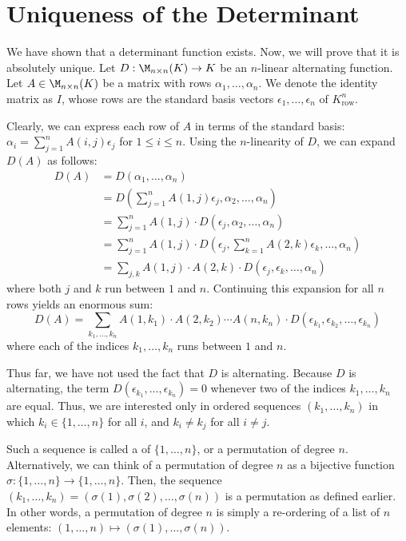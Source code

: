 \section{Uniqueness of the Determinant}

We have shown that a determinant function exists. Now, we will prove that it is absolutely unique. Let $D : \M_{n \times n}(K) \to K$ be an $n$-linear alternating function.
Let $A \in \M_{n \times n}(K)$ be a matrix with rows $\alpha_1, \dots, \alpha_n$. We denote the identity matrix as $I$, whose rows are the standard basis vectors $\epsilon_1, \dots, \epsilon_n$ of $K^n_{\text{row}}$.

Clearly, we can express each row of $A$ in terms of the standard basis: $\alpha_i = \sum_{j=1}^n A(i,j)\epsilon_j$ for $1 \le i \le n$. Using the $n$-linearity of $D$, we can expand $D(A)$ as follows:
\begin{align*}
  D(A) &= D(\alpha_1, \dots, \alpha_n) \\
  &= D\left(\sum_{j=1}^n A(1,j)\epsilon_j, \alpha_2, \dots, \alpha_n\right) \\
  &= \sum_{j=1}^n A(1,j) \cdot D(\epsilon_j, \alpha_2, \dots, \alpha_n) \\
  &= \sum_{j=1}^n A(1,j) \cdot D\left(\epsilon_j, \sum_{k=1}^n A(2,k)\epsilon_k, \dots, \alpha_n\right) \\
  &= \sum_{j,k} A(1,j) \cdot A(2,k) \cdot D(\epsilon_j, \epsilon_k, \dots, \alpha_n)
\end{align*}
where both $j$ and $k$ run between $1$ and $n$. Continuing this expansion for all $n$ rows yields an enormous sum:
\[
D(A) = \sum_{k_1, \dots, k_n} A(1,k_1) \cdot A(2,k_2) \cdots A(n,k_n) \cdot D(\epsilon_{k_1}, \epsilon_{k_2}, \dots, \epsilon_{k_n})
\]
where each of the indices $k_1, \dots, k_n$ runs between $1$ and $n$.

Thus far, we have not used the fact that $D$ is alternating. Because $D$ is alternating, the term $D(\epsilon_{k_1}, \dots, \epsilon_{k_n}) = 0$ whenever two of the indices $k_1, \dots, k_n$ are equal. Thus, we are interested only in ordered sequences $(k_1, \dots, k_n)$ in which $k_i \in \{1, \dots, n\}$ for all $i$, and $k_i \neq k_j$ for all $i \neq j$.

Such a sequence is called a  of $\{1, \dots, n\}$, or a permutation of degree $n$. Alternatively, we can think of a permutation of degree $n$ as a bijective function $\sigma : \{1, \dots, n\} \to \{1, \dots, n\}$. Then, the sequence $(k_1, \dots, k_n) = (\sigma(1), \sigma(2), \dots, \sigma(n))$ is a permutation as defined earlier. In other words, a permutation of degree $n$ is simply a re-ordering of a list of $n$ elements: $(1, \dots, n) \mapsto (\sigma(1), \dots, \sigma(n))$.

